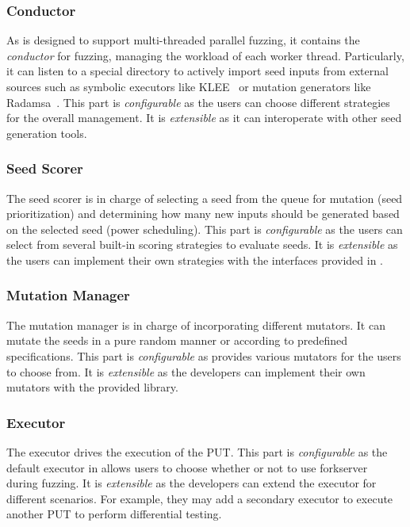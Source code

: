 \subsubsection{Conductor}
As {\FOT} is designed to support multi-threaded parallel fuzzing, it contains the \emph{conductor} for fuzzing, managing the workload of each worker thread.
Particularly, it can listen to a special directory to actively import seed inputs from external sources such as symbolic executors like KLEE~\cite{klee} or mutation generators like Radamsa~\cite{radamsa}.
This part is \textit{configurable} as the users can choose different strategies for the overall management.
It is \textit{extensible} as it can interoperate with other seed generation tools.


\subsubsection{Seed Scorer}
The seed scorer is in charge of selecting a seed from the queue for mutation (seed prioritization) and determining how many new inputs should be generated based on the selected seed (power scheduling).
This part is \textit{configurable} as the users can select from several built-in scoring strategies to evaluate seeds.
It is \textit{extensible} as the users can implement their own strategies with the interfaces provided in {\FOT}.


\subsubsection{Mutation Manager}
The mutation manager is in charge of incorporating different mutators.
It can mutate the seeds in a pure random manner or according to predefined specifications.
This part is \textit{configurable} as {\FOT} provides various mutators for the users to choose from.
It is \textit{extensible} as the developers can implement their own mutators with the provided library.

\subsubsection{Executor}
The executor drives the execution of the PUT.
This part is \textit{configurable} as the default executor in {\FOT} allows users to choose whether or not to use forkserver~\cite{afl} during fuzzing.
It is \textit{extensible} as the developers can extend the executor for different scenarios.
For example, they may add a secondary executor to execute another PUT to perform differential testing.

